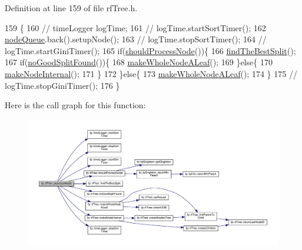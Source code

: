Definition at line 159 of file rf\+Tree.\+h.


\begin{DoxyCode}
159                                           \{
160                     \textcolor{comment}{//  timeLogger logTime;}
161                     \textcolor{comment}{//  logTime.startSortTimer();}
162                     \hyperlink{classfp_1_1rfTree_af72d0a2f930fd480dfb4858885c2df23}{nodeQueue}.back().setupNode();
163                     \textcolor{comment}{//  logTime.stopSortTimer();}
164                     \textcolor{comment}{//  logTime.startGiniTimer();}
165                     \textcolor{keywordflow}{if}(\hyperlink{classfp_1_1rfTree_a36abf82d31ca57670b09da16525dce0d}{shouldProcessNode}())\{
166                         \hyperlink{classfp_1_1rfTree_a51da8e4a46582b26643a4ae392230e77}{findTheBestSplit}();
167                         \textcolor{keywordflow}{if}(\hyperlink{classfp_1_1rfTree_a618bdc2d22267b4bb4f5e1881b1788f6}{noGoodSplitFound}())\{
168                             \hyperlink{classfp_1_1rfTree_a2b2a47186c0784415609f1c9b005e702}{makeWholeNodeALeaf}();
169                         \}\textcolor{keywordflow}{else}\{
170                             \hyperlink{classfp_1_1rfTree_aaf7bbdde5f7313c3e84853bbf5fdf792}{makeNodeInternal}();
171                         \}
172                     \}\textcolor{keywordflow}{else}\{
173                         \hyperlink{classfp_1_1rfTree_a2b2a47186c0784415609f1c9b005e702}{makeWholeNodeALeaf}();
174                     \}
175                     \textcolor{comment}{//  logTime.stopGiniTimer();}
176                 \}
\end{DoxyCode}
Here is the call graph for this function\+:
\nopagebreak
\begin{figure}[H]
\begin{center}
\leavevmode
\includegraphics[width=350pt]{classfp_1_1rfTree_ab7760333f6857ab7ce2ee29a7bc16e65_cgraph}
\end{center}
\end{figure}
\mbox{\label{classfp_1_1rfTree_ab7760333f6857ab7ce2ee29a7bc16e65}} 
